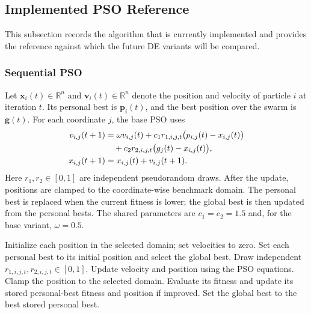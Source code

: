 \documentclass[conference]{IEEEtran}
\newcommand{\R}{\mathbb{R}}
\begin{document}
\subsection{Implemented PSO Reference}
\label{sec:pso}
This subsection records the algorithm that is currently implemented and
provides the reference against which the future DE variants will be compared.

\subsubsection{Sequential PSO}
\label{sec:pso-seq}
Let $\mathbf{x}_i(t)\in\R^n$ and $\mathbf{v}_i(t)\in\R^n$ denote the position
and velocity of particle $i$ at iteration $t$. Its personal best is
$\mathbf{p}_i(t)$, and the best position over the swarm is $\mathbf{g}(t)$.
For each coordinate $j$, the base PSO uses
\begin{align}
 v_{i,j}(t+1) &=
 \omega v_{i,j}(t)
 + c_1 r_{1,i,j,t}\bigl(p_{i,j}(t)-x_{i,j}(t)\bigr) \notag\\
 &\quad + c_2 r_{2,i,j,t}\bigl(g_j(t)-x_{i,j}(t)\bigr), \\
 x_{i,j}(t+1) &= x_{i,j}(t)+v_{i,j}(t+1).
\end{align}
Here $r_1,r_2\in[0,1]$ are independent pseudorandom draws. After the update,
positions are clamped to the coordinate-wise benchmark domain. The personal
best is replaced when the current fitness is lower; the global best is then
updated from the personal bests. The shared parameters are
$c_1=c_2=1.5$ and, for the base variant, $\omega=0.5$.

\begin{algorithm}[t]
\caption{Sequential PSO used as the reference}
\label{alg:pso-seq}
\begin{algorithmic}[1]
\STATE Initialize each position in the selected domain; set velocities to zero.
\STATE Set each personal best to its initial position and select the global best.
    \STATE Draw independent $r_{1,i,j,t},r_{2,i,j,t}\in[0,1]$.
    \STATE Update velocity and position using the PSO equations.
    \STATE Clamp the position to the selected domain.
  \ENDFOR
    \STATE Evaluate its fitness and update its stored personal-best fitness
           and position if improved.
  \ENDFOR
  \STATE Set the global best to the best stored personal best.
\ENDFOR
\end{algorithmic}
\end{algorithm}
\end{document}
